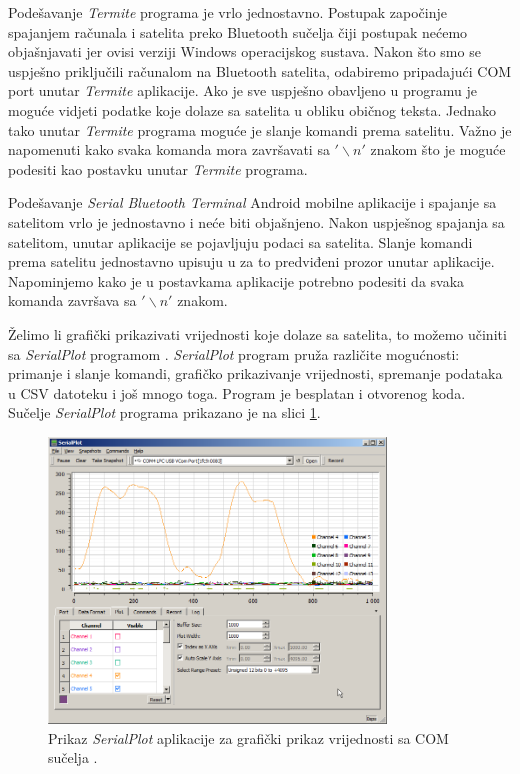 \documentclass[times, utf8, diplomski, numeric]{templates/template}
\begin{document}
{{        Podešavanje \emph{Termite} programa je vrlo jednostavno. Postupak započinje spajanjem računala i satelita preko Bluetooth sučelja čiji postupak nećemo objašnjavati jer ovisi verziji Windows operacijskog sustava. Nakon što smo se uspješno priključili računalom na Bluetooth satelita, odabiremo pripadajući COM port unutar \emph{Termite} aplikacije. Ako je sve uspješno obavljeno u programu je moguće vidjeti podatke koje dolaze sa satelita u obliku običnog teksta. Jednako tako unutar \emph{Termite} programa moguće je slanje komandi prema satelitu. Važno je napomenuti kako svaka komanda mora završavati sa $'\backslash n'$ znakom što je moguće podesiti kao postavku unutar \emph{Termite} programa. 

        Podešavanje \emph{Serial Bluetooth Terminal} Android mobilne aplikacije i spajanje sa satelitom vrlo je jednostavno i neće biti objašnjeno. Nakon uspješnog spajanja sa satelitom, unutar aplikacije se pojavljuju podaci sa satelita. Slanje komandi prema satelitu jednostavno upisuju u za to predviđeni prozor unutar aplikacije. Napominjemo kako je u postavkama aplikacije potrebno podesiti da svaka komanda završava sa $'\backslash n'$ znakom. 

        Želimo li grafički prikazivati vrijednosti koje dolaze sa satelita, to možemo učiniti sa \emph{SerialPlot} programom \cite{serialplot}. \emph{SerialPlot} program pruža različite mogućnosti: primanje i slanje komandi, grafičko prikazivanje vrijednosti, spremanje podataka u CSV datoteku i još mnogo toga. Program je besplatan i otvorenog koda. Sučelje \emph{SerialPlot} programa prikazano je na slici \ref{fig:serialplot}.

        \begin{figure}[htb]
        \centering
        \includegraphics[width=0.8\textwidth]{images/serialplot.png}
        \caption{Prikaz \emph{SerialPlot} aplikacije za grafički prikaz vrijednosti sa COM sučelja \cite{serialplot}.}
        \label{fig:serialplot}
        \end{figure}

}}
\end{document}
